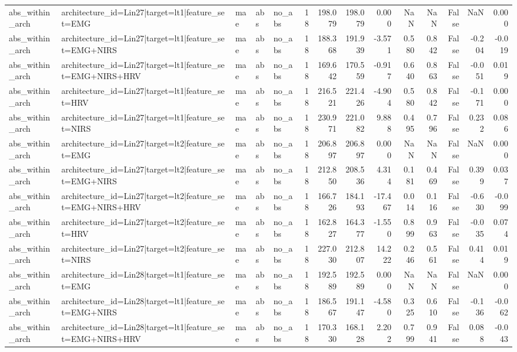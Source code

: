 \begin{table}
\begin{tabular}{lllllrrrrrrrrr}
abs_within_arch & architecture_id=Lin27|target=lt1|feature_set=EMG & mae & abs & no_abs & 18 & 198.079 & 198.079 & 0.000 & NaN & NaN & False & NaN & 0.000 \\
abs_within_arch & architecture_id=Lin27|target=lt1|feature_set=EMG+NIRS & mae & abs & no_abs & 18 & 188.368 & 191.939 & -3.571 & 0.580 & 0.842 & False & -0.204 & -0.019 \\
abs_within_arch & architecture_id=Lin27|target=lt1|feature_set=EMG+NIRS+HRV & mae & abs & no_abs & 18 & 169.642 & 170.559 & -0.917 & 0.640 & 0.863 & False & -0.051 & 0.019 \\
abs_within_arch & architecture_id=Lin27|target=lt1|feature_set=HRV & mae & abs & no_abs & 18 & 216.521 & 221.426 & -4.904 & 0.580 & 0.842 & False & -0.171 & 0.000 \\
abs_within_arch & architecture_id=Lin27|target=lt1|feature_set=NIRS & mae & abs & no_abs & 18 & 230.971 & 221.082 & 9.888 & 0.495 & 0.796 & False & 0.232 & 0.086 \\
abs_within_arch & architecture_id=Lin27|target=lt2|feature_set=EMG & mae & abs & no_abs & 18 & 206.897 & 206.897 & 0.000 & NaN & NaN & False & NaN & 0.000 \\
abs_within_arch & architecture_id=Lin27|target=lt2|feature_set=EMG+NIRS & mae & abs & no_abs & 18 & 212.850 & 208.536 & 4.314 & 0.181 & 0.469 & False & 0.399 & 0.037 \\
abs_within_arch & architecture_id=Lin27|target=lt2|feature_set=EMG+NIRS+HRV & mae & abs & no_abs & 18 & 166.726 & 184.193 & -17.467 & 0.014 & 0.116 & False & -0.630 & -0.099 \\
abs_within_arch & architecture_id=Lin27|target=lt2|feature_set=HRV & mae & abs & no_abs & 18 & 162.827 & 164.377 & -1.550 & 0.899 & 0.963 & False & -0.035 & 0.074 \\
abs_within_arch & architecture_id=Lin27|target=lt2|feature_set=NIRS & mae & abs & no_abs & 18 & 227.030 & 212.807 & 14.222 & 0.246 & 0.561 & False & 0.414 & 0.019 \\
abs_within_arch & architecture_id=Lin28|target=lt1|feature_set=EMG & mae & abs & no_abs & 18 & 192.589 & 192.589 & 0.000 & NaN & NaN & False & NaN & 0.000 \\
abs_within_arch & architecture_id=Lin28|target=lt1|feature_set=EMG+NIRS & mae & abs & no_abs & 18 & 186.567 & 191.147 & -4.580 & 0.325 & 0.610 & False & -0.136 & -0.062 \\
abs_within_arch & architecture_id=Lin28|target=lt1|feature_set=EMG+NIRS+HRV & mae & abs & no_abs & 18 & 170.330 & 168.128 & 2.202 & 0.799 & 0.941 & False & 0.088 & -0.043 \\

\end{tabular}
\end{table}
